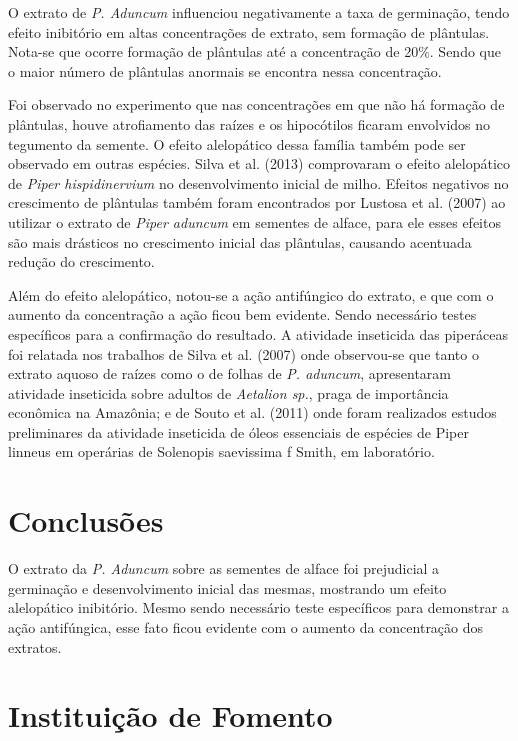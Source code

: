 \documentclass[article,12pt,onesidea,4paper,english,brazil]{abntex2}
\begin{document}
	O extrato de \textit{P. Aduncum} influenciou negativamente a taxa de germinação, tendo efeito inibitório em altas concentrações de extrato, sem formação de plântulas. Nota-se que ocorre formação de plântulas até a concentração de 20\%. Sendo que o maior número de plântulas anormais se encontra nessa concentração. 
	
	Foi observado no experimento que nas concentrações em que não há formação de plântulas, houve atrofiamento das raízes e os hipocótilos ficaram envolvidos no tegumento da semente. O efeito alelopático dessa família também pode ser observado em outras espécies. Silva et al. (2013) comprovaram o efeito alelopático de \textit{Piper hispidinervium} no desenvolvimento inicial de milho. Efeitos negativos no crescimento de plântulas também foram encontrados por Lustosa et al. (2007) ao utilizar o extrato de \textit{Piper aduncum} em sementes de alface, para ele esses efeitos são mais drásticos no crescimento inicial das plântulas, causando acentuada redução do crescimento. 
	
	Além do efeito alelopático, notou-se a ação antifúngico do extrato, e que com o aumento da concentração a ação ficou bem evidente. Sendo necessário testes específicos para a confirmação do resultado. A atividade inseticida das piperáceas foi relatada nos trabalhos de Silva et al. (2007) onde observou-se que tanto o extrato aquoso de raízes como o de folhas de \textit{P. aduncum}, apresentaram atividade inseticida sobre adultos de \textit{Aetalion sp.}, praga de importância econômica na Amazônia; e de Souto et al. (2011) onde foram realizados estudos preliminares da atividade inseticida de óleos essenciais de espécies de Piper linneus em operárias de Solenopis saevissima f Smith, em laboratório.
	
	
	\section*{Conclusões}
	
	O extrato da \textit{P. Aduncum} sobre as sementes de alface foi prejudicial a germinação e desenvolvimento inicial das mesmas, mostrando um efeito alelopático inibitório. Mesmo sendo necessário teste específicos para demonstrar a ação antifúngica, esse fato ficou evidente com o aumento da concentração dos extratos.
	
	\section*{Instituição de Fomento}
	
\end{document}
